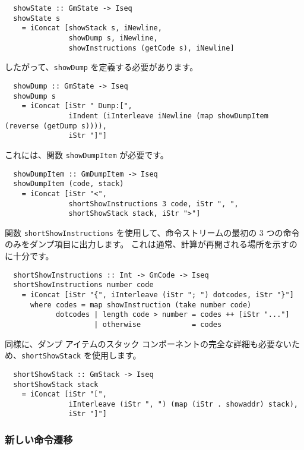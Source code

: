\documentclass{jarticle}
\begin{document}
\begin{verbatim}
  showState :: GmState -> Iseq
  showState s
    = iConcat [showStack s, iNewline,
               showDump s, iNewline,
               showInstructions (getCode s), iNewline]
\end{verbatim}

したがって、\texttt{showDump} を定義する必要があります。

\begin{verbatim}
  showDump :: GmState -> Iseq
  showDump s
    = iConcat [iStr " Dump:[",
               iIndent (iInterleave iNewline (map showDumpItem (reverse (getDump s)))),
               iStr "]"]
\end{verbatim}

これには、関数 \texttt{showDumpItem} が必要です。

\begin{verbatim}
  showDumpItem :: GmDumpItem -> Iseq
  showDumpItem (code, stack)
    = iConcat [iStr "<",
               shortShowInstructions 3 code, iStr ", ",
               shortShowStack stack, iStr ">"]
\end{verbatim}

関数 \texttt{shortShowInstructions} を使用して、命令ストリームの最初の 3 つの命令のみをダンプ項目に出力します。
これは通常、計算が再開される場所を示すのに十分です。

\begin{verbatim}
  shortShowInstructions :: Int -> GmCode -> Iseq
  shortShowInstructions number code
    = iConcat [iStr "{", iInterleave (iStr "; ") dotcodes, iStr "}"]
      where codes = map showInstruction (take number code)
            dotcodes | length code > number = codes ++ [iStr "..."]
                     | otherwise            = codes
\end{verbatim}

同様に、ダンプ アイテムのスタック コンポーネントの完全な詳細も必要ないため、\texttt{shortShowStack} を使用します。

\begin{verbatim}
  shortShowStack :: GmStack -> Iseq
  shortShowStack stack
    = iConcat [iStr "[",
               iInterleave (iStr ", ") (map (iStr . showaddr) stack),
               iStr "]"]
\end{verbatim}

\subsubsection{新しい命令遷移} \label{sec_3_6_3}
\end{document}
